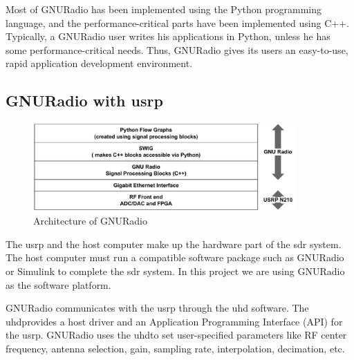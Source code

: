 Most of GNURadio has been implemented using the Python programming language,
and the performance-critical parts have been implemented using C++. Typically,
a GNURadio user writes his applications in Python, unless he has some
performance-critical needs. Thus, GNURadio gives its users an easy-to-use,
rapid application development environment.

\subsection{GNURadio with \gls{usrp}}

\begin{figure}
\centering
\includegraphics[width=0.9\textwidth]{../images/gnuradio_architecture}
\caption{Architecture of GNURadio}
\label{gnuradio_architecture}
\end{figure}

The \gls{usrp} and the host computer make up the hardware part of the \gls{sdr} system. 
The host computer must run a compatible software package such as GNURadio or
Simulink to complete the \gls{sdr} system. In this project we are using GNURadio
as the software platform.

GNURadio communicates with the \gls{usrp} through the \gls{uhd}
software. The \gls{uhd}provides a host driver and an Application Programming
Interface (API) for the \gls{usrp}. GNURadio uses the \gls{uhd}to set user-specified
parameters like RF center frequency, antenna selection, gain, sampling rate,
interpolation, decimation, etc.

